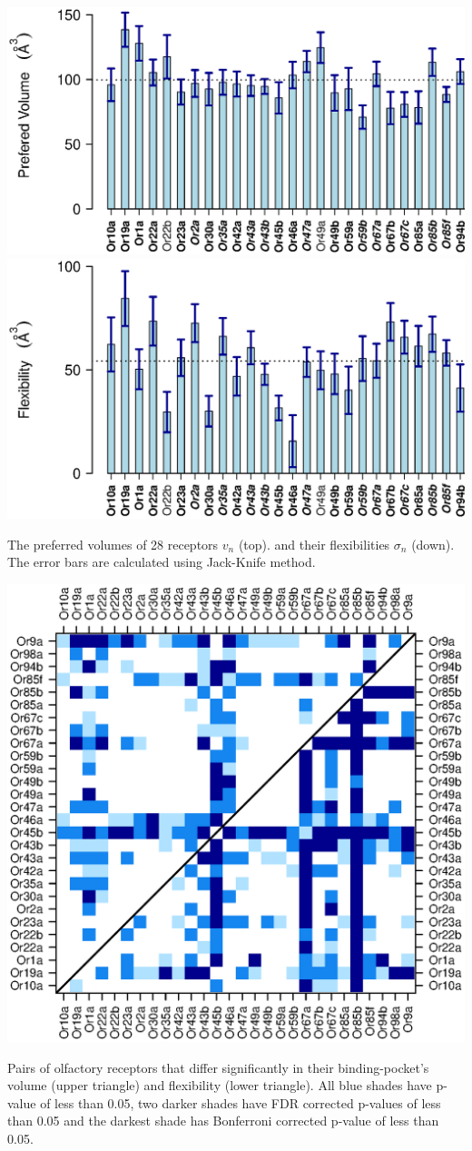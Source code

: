 \documentclass[a1paper,fontscale=0.6]{baposter} %
\newcommand{\numberofreceptors}{ 28 }
\begin{document}
\begin{poster}
{\begin{center}
		\includegraphics[width=  0.49 \textwidth]{fig/mean-vol}
		\includegraphics[width=  0.49 \textwidth]{fig/std-vol}
\end{center}
The preferred volumes of \numberofreceptors receptors $v_n$ (top). 
and their flexibilities $\sigma_n$ (down). 
The error bars are calculated using Jack-Knife method. 

\begin{center}
\includegraphics[width= 0.75 \textwidth]{fig/pair-pval}
\end{center}
Pairs of olfactory receptors that differ significantly in their binding-pocket's volume (upper triangle) and flexibility (lower triangle).
			All blue shades have p-value of less than 0.05, 
			two darker shades have FDR corrected p-values of less than 0.05 and the darkest shade has Bonferroni corrected p-value of less than 0.05.

}
\end{poster}
\end{document}
